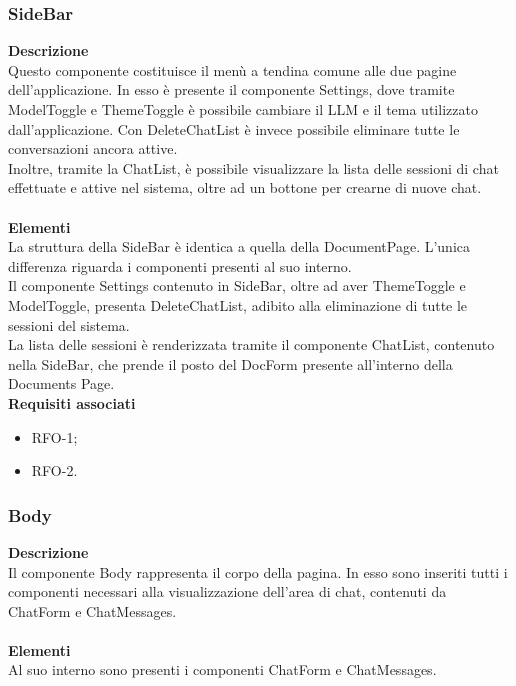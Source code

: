 \subsubsection{SideBar}
\textbf{Descrizione}\\
Questo componente costituisce il menù a tendina comune alle due pagine dell’applicazione. In esso è presente il componente Settings, dove tramite ModelToggle e ThemeToggle è possibile cambiare il LLM e il tema utilizzato dall’applicazione. Con DeleteChatList è invece possibile eliminare tutte le conversazioni ancora attive.\\
Inoltre, tramite la ChatList, è possibile visualizzare la lista delle sessioni di chat effettuate e attive nel sistema, oltre ad un bottone per crearne di nuove chat.\\ \\
\textbf{Elementi}\\
La struttura della SideBar è identica a quella della DocumentPage. L'unica differenza riguarda i componenti presenti al suo interno.\\
Il componente Settings contenuto in SideBar, oltre ad aver ThemeToggle e ModelToggle, presenta DeleteChatList, adibito alla eliminazione di tutte le sessioni del sistema.\\
La lista delle sessioni è renderizzata tramite il componente ChatList, contenuto nella SideBar, che prende il posto del DocForm presente all'interno della Documents Page.
\\


\textbf{Requisiti associati}
\begin{itemize}[itemsep=-4pt]
    \item RFO-1;
    \item RFO-2.
\end{itemize}

\subsubsection{Body}

\textbf{Descrizione}\\
Il componente Body rappresenta il corpo della pagina. In esso sono inseriti tutti i componenti necessari alla visualizzazione dell'area di chat, contenuti da ChatForm e ChatMessages.\\ \\
\textbf{Elementi}\\
Al suo interno sono presenti i componenti ChatForm e ChatMessages.

